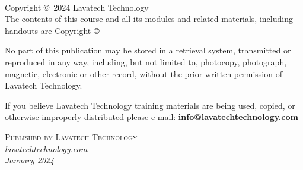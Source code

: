\documentclass[14pt,fleqn]{extbook} %
\begin{document}

\begingroup
\thispagestyle{empty} %
\vfill
\endgroup


\newpage



~\vfill
\thispagestyle{empty}

\noindent Copyright \copyright\ 2024 Lavatech Technology\\ %

The contents of this course and all its modules and related materials, including handouts are
Copyright ©

No part of this publication may be stored in a retrieval system, transmitted or reproduced in any way, including, but not limited to, photocopy, photograph, magnetic, electronic or other record, without the prior written permission of Lavatech Technology.

If you believe Lavatech Technology training materials are being used, copied, or otherwise improperly distributed please e-mail: 
\newline
\textbf{info@lavatechtechnology.com}

\noindent \textsc{Published by Lavatech Technology}\\ %

\noindent \textit{lavatechtechnology.com}\\ %

%
\noindent \textit{January 2024} %
\end{document}
